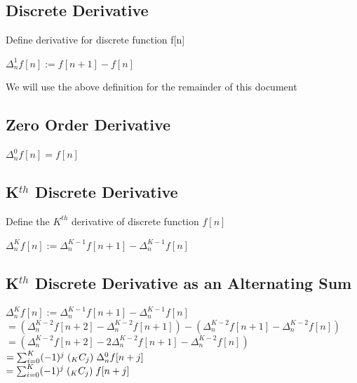 \documentclass[11pt]{article}
\begin{document}
\subsection{Discrete Derivative}
Define derivative for discrete function f[n]
\begin{center}
\vspace{1mm}
$
\Delta_n^1 f[n] := f[n+1] - f[n]
$
\end{center}
\vspace{1mm}
We will use the above definition for the remainder of this document \\


\subsection{Zero Order Derivative}
\begin{center}
\vspace{1mm}
$
\Delta_n^0 f[n] = f[n]
$
\end{center}




\subsection{K$^{th}$ Discrete Derivative}
Define the $K^{th}$ derivative of discrete function $f[n]$
\begin{center}
\vspace{1mm}
$
\Delta_n^K f[n] := \Delta_n^{K-1} f[n+1] - \Delta_n^{K-1} f[n]
$
\end{center}




\subsection{K$^{th}$ Discrete Derivative as an Alternating Sum}
\begin{center}
$
\Delta_n^K f[n] := \Delta_n^{K-1} f[n+1] - \Delta_n^{K-1} f[n]
$
\\ \vspace{4mm}
$
= (\Delta_n^{K-2} f[n+2] - \Delta_n^{K-2} f[n+1]) - (\Delta_n^{K-2} f[n+1] - \Delta_n^{K-2} f[n])
$
\\ \vspace{4mm}
$
= (\Delta_n^{K-2} f[n+2] - 2\Delta_n^{K-2} f[n+1] - \Delta_n^{K-2} f[n])
$
\\ \vspace{4mm}
$
=  \sum_{i=0}^K (-1)^{j} \hspace{1mm} (_K C _j) \hspace{1mm} \Delta_n^{0} f[n + j]
$
\\ \vspace{4mm}
$
= \sum_{i=0}^K (-1)^{j} \hspace{1mm} (_K C _j) \hspace{1mm} f[n + j]
$
\end{center}
\end{document}
